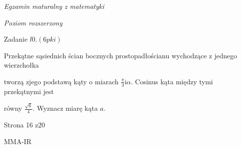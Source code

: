 \documentclass[a4paper,12pt]{article}
\begin{document}
{\it Egzamin maturalny z matematyki}

{\it Poziom rozszerzony}

Zadanie $l0. (6pki)$

Przekątne sąsiednich ścian bocznych prostopadłościanu wychodzące z jednego wierzchołka

tworzą zjego podstawą kąty o miarach $\displaystyle \frac{\pi}{3} \mathrm{i} \alpha$. Cosinus kąta między tymi przekątnymi jest

równy $\displaystyle \frac{\sqrt{6}}{4}$. Wyznacz miarę kąta $a.$

Strona 16 z20

MMA-IR
\end{document}
